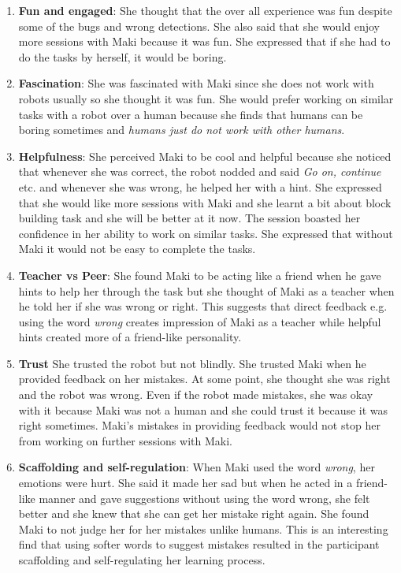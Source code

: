 \begin{enumerate}
    \item \textbf{Fun and engaged}: She thought that the over all experience was fun despite some of the bugs and wrong detections. She also said that she would enjoy more sessions with Maki because it was fun. She expressed that if she had to do the tasks by herself, it would be boring.
    \item \textbf{Fascination}: She was fascinated with Maki since she does not work with robots usually so she thought it was fun. She would prefer working on similar tasks with a robot over a human because she finds that humans can be boring sometimes and \emph{humans just do not work with other humans}.
    \item \textbf{Helpfulness}: She perceived Maki to be cool and helpful because she noticed that whenever she was correct, the robot nodded and said \emph{Go on, continue} etc. and whenever she was wrong, he helped her with a hint. She expressed that she would like more sessions with Maki and she learnt a bit about block building task and she will be better at it now. The session boasted her confidence in her ability to work on similar tasks. She expressed that without Maki it would not be easy to complete the tasks.
    \item \textbf{Teacher vs Peer}: She found Maki to be acting like a friend when he gave hints to help her through the task but she thought of Maki as a teacher when he told her if she was wrong or right. This suggests that direct feedback e.g. using the word \emph{wrong} creates impression of Maki as a teacher while helpful hints created more of a friend-like personality. 
    \item \textbf{Trust} She trusted the robot but not blindly. She trusted Maki when he provided feedback on her mistakes. At some point, she thought she was right and the robot was wrong. Even if the robot made mistakes, she was okay with it because Maki was not a human and she could trust it because it was right sometimes. Maki's mistakes in providing feedback would not stop her from working on further sessions with Maki. 
    \item \textbf{Scaffolding and self-regulation}: When Maki used the word \emph{wrong}, her emotions were hurt. She said it made her sad but when he acted in a friend-like manner and gave suggestions without using the word wrong, she felt better and she knew that she can get her mistake right again. She found Maki to not judge her for her mistakes unlike humans. This is an interesting find that using softer words to suggest mistakes resulted in the participant scaffolding and self-regulating her learning process. 

\end{enumerate}
